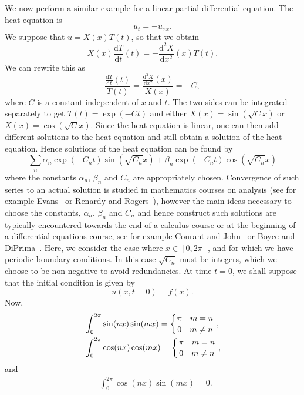 We now perform a similar example for a linear partial differential equation. The heat equation is 
\begin{equation}
u_t=-u_{xx}.
\end{equation}
We suppose that $u=X(x)T(t)$, so that we obtain
\begin{equation}
X(x)\frac{\mathrm{d}T}{\mathrm{d}t}(t)=-\frac{\mathrm{d}^2X}{\mathrm{d}x^2}(x)T(t).
\end{equation}
We can rewrite this as
\begin{equation}
\frac{\frac{\mathrm{d}T}{\mathrm{d}t}(t)}{T(t)}=\frac{\frac{\mathrm{d}^2X}{\mathrm{d}x^2}(x)}{X(x)}=-C,
\end{equation}
where $C$ is a constant independent of $x$ and $t$. The two sides can be integrated separately to get $T(t)=\exp(-Ct)$ and either $X(x)=\sin(\sqrt{C}x)$ or $X(x)=\cos(\sqrt{C}x)$. Since the heat equation is linear, one can then add different solutions to the heat equation and still obtain a solution of the heat equation. Hence solutions of the heat equation can be found by
\begin{equation}
\sum_n \alpha_n\exp(-C_nt)\sin(\sqrt{C_n}x) + \beta_n\exp(-C_nt)\cos(\sqrt{C_n}x)
\end{equation}
where the constants $\alpha_n$, $\beta_n$ and $C_n$ are appropriately chosen. Convergence of such series to an actual solution is studied in mathematics courses on analysis (see for example Evans~\cite{Eva10} or Renardy and Rogers~\cite{RenRog04}), however the main ideas necessary to choose the constants, $\alpha_n$, $\beta_n$ and $C_n$ and hence construct such solutions are typically encountered towards the end of a calculus course or at the beginning of a differential equations course, see for example Courant and John~\cite{CouJoh98} or Boyce and DiPrima~\cite{BoyDip10}. Here, we consider the case where $x\in[0,2\pi]$, and for which we have periodic boundary conditions. In this case $\sqrt{C_n}$ must be integers, which we choose to be non-negative to avoid redundancies. At time $t=0$, we shall suppose that the initial condition is given by 
\begin{equation}
u(x,t=0)=f(x).
\end{equation}
Now, 
\begin{align}
&{} \int_0^{2\pi}\sin(nx)\sin(mx)=\left\{{\pi\quad m=n}\atop{0 \quad m\ne n}\right.,
\\&{} \int_0^{2\pi}\cos(nx)\cos(mx)=\left\{{\pi\quad m=n}\atop{0 \quad m\ne n}\right.,
\end{align}
and
\begin{align}
&{} \int_0^{2\pi}\cos(nx)\sin(mx)=0.
\end{align}
